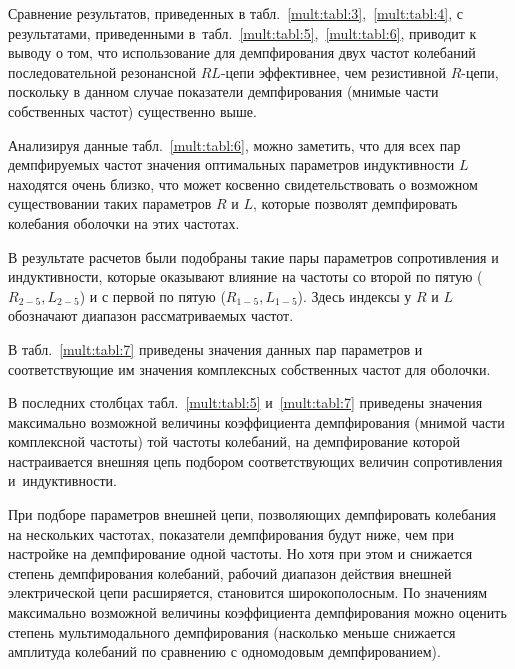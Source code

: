 Сравнение результатов, приведенных в табл.~\ref{mult:tabl:3},~\ref{mult:tabl:4}, с результатами, приведенными в~табл.~\ref{mult:tabl:5},~\ref{mult:tabl:6}, приводит к выводу о том, что использование для демпфирования двух частот колебаний последовательной резонансной $RL$-цепи эффективнее, чем резистивной $R$-цепи, поскольку в данном случае показатели демпфирования (мнимые части собственных частот) существенно выше.



Анализируя данные табл.~\ref{mult:tabl:6}, можно заметить, что для всех пар демпфируемых частот значения оптимальных параметров индуктивности $L$ находятся очень близко, что может косвенно свидетельствовать о возможном существовании таких параметров $R$ и $L$, которые позволят демпфировать колебания оболочки на этих частотах.



В результате расчетов были подобраны такие пары параметров сопротивления и индуктивности, которые оказывают влияние на частоты со второй по пятую ($R_{2-5}, L_{2-5}$) и с первой по пятую ($R_{1-5}, L_{1-5}$). Здесь индексы у $R$ и $L$ обозначают диапазон рассматриваемых частот.

В табл.~\ref{mult:tabl:7} приведены значения данных пар параметров и соответствующие им значения комплексных собственных частот для оболочки.







В последних столбцах табл.~\ref{mult:tabl:5} и~\ref{mult:tabl:7} приведены значения максимально возможной величины коэффициента демпфирования (мнимой части комплексной частоты) той частоты колебаний, на демпфирование которой настраивается внешняя цепь подбором соответствующих величин сопротивления и~индуктивности.



При подборе параметров внешней цепи, позволяющих демпфировать колебания на нескольких частотах, показатели демпфирования будут ниже, чем при настройке на демпфирование одной частоты. Но хотя при этом и снижается степень демпфирования колебаний,  рабочий диапазон действия внешней электрической цепи расширяется, становится широкополосным. По значениям максимально возможной величины коэффициента демпфирования можно оценить степень мультимодального демпфирования (насколько меньше снижается амплитуда колебаний по сравнению с одномодовым демпфированием).



\smallskip



